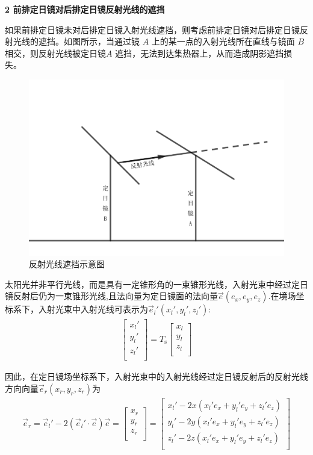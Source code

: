 \documentclass[../main.tex]{subfiles}
\begin{document}
\par \textbf{2 前排定日镜对后排定日镜反射光线的遮挡}
\par  如果前排定日镜未对后排定日镜入射光线遮挡，则考虑前排定日镜对后排定日镜反射光线的遮挡。如图所示，当通过镜 $A$ 上的某一点的入射光线所在直线与镜面 $B$ 相交，则反射光线被定日镜$A$ 遮挡，无法到达集热器上，从而造成阴影遮挡损失。
    \begin{figure}[H]
    \centering
    \includegraphics[width=.9\textwidth]{8}
    \caption{反射光线遮挡示意图}
    \label{1.1234}
\end{figure}
\par 太阳光并非平行光线，而是具有一定锥形角的一束锥形光线，入射光束中经过定日镜反射后仍为一束锥形光线,且法向量为定日镜面的法向量$\vec{e}(e_x,e_y,e_z)$.在境场坐标系下，入射光束中入射光线可表示为$\vec{e}_l'(x_l', y_l', z_l')$:
\begin{align}    \label{1.323}
\left[ \begin{matrix}
x_l'\\
y_l'\\
z_l'\\
\end{matrix} \right] =T_{\text{s}}\left[ \begin{matrix}
x_l\\
y_l\\
z_l\\
\end{matrix} \right]
\end{align}
\par 因此，在定日镜场坐标系下，入射光束中的入射光线经过定日镜反射后的反射光线方向向量$\vec{e}_r(x_r, y_r, z_r)$为
\begin{align}  \label{1.6789}
\vec{e}_r = \vec{e}_l' - 2 (\vec{e}_l' \cdot \vec{e}) \vec{e}=
\left[
  \begin{matrix}
x_r\\
y_r\\
z_r\\
\end{matrix} \right] =\left[ \begin{matrix}
x_l' - 2x(x_l'{e_x} + y_l'{e_y} + z_l'{e_z}) \\
y_l' - 2y(x_l'{e_x} + y_l'{e_y} + z_l'{e_z})\\
z_l' - 2z(x_l'{e_x} + y_l'{e_y} + z_l'{e_z})\\
\end{matrix} \right]
\end{align}
\end{document}
